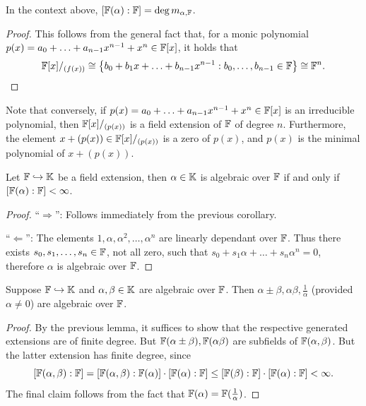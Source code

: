 \begin{corollary}
    In the context above, $[\mathbb{F}(\alpha) : \mathbb{F}] = \deg m_{\alpha,\mathbb{F}}$.
\end{corollary}

\begin{proof}
    This follows from the general fact that, for a monic polynomial $p(x) = a_0 + \ldots + a_{n-1} x^{n-1} + x^n \in \mathbb{F}[x]$, it holds that
    \[
        \mathbb{F}[x]/_{(f(x))} \cong \left\{ b_0 + b_1 x + \ldots + b_{n-1} x^{n-1} : b_0, \ldots, b_{n-1} \in \mathbb{F} \right\} \cong \mathbb{F}^n. \qedhere
    \]
\end{proof}

Note that conversely, if $p(x) = a_0 + \ldots + a_{n-1} x^{n-1} + x^n \in \mathbb{F}[x]$ is an irreducible polynomial, then $\mathbb{F}[x]/_{(p(x))}$ is a field extension of $\mathbb{F}$ of degree $n$. Furthermore, the element $x + (p(x)) \in \mathbb{F}[x]/_{(p(x))}$ is a zero of $p(x)$, and $p(x)$ is the minimal polynomial of $x + (p(x))$.

\begin{lemma}
    Let $\mathbb{F} \hookrightarrow \mathbb{K}$ be a field extension, then $\alpha \in \mathbb{K}$ is algebraic over $\mathbb{F}$ if and only if $[\mathbb{F}(\alpha) : \mathbb{F}] < \infty$.
\end{lemma}

\begin{proof}
    ``$\Longrightarrow$'': Follows immediately from the previous corollary.

    ``$\Longleftarrow$'': The elements $1, \alpha, \alpha^2, \ldots, \alpha^n$ are linearly dependant over $\mathbb{F}$. Thus there exists $s_0, s_1, \ldots, s_n \in \mathbb{F}$, not all zero, such that $s_0 + s_1 \alpha + \ldots + s_n \alpha^n = 0$, therefore $\alpha$ is algebraic over $\mathbb{F}$.
\end{proof}

\begin{corollary}
    Suppose $\mathbb{F} \hookrightarrow \mathbb{K}$ and $\alpha, \beta \in \mathbb{K}$ are algebraic over $\mathbb{F}$. Then $\alpha \pm \beta, \alpha \beta, \frac{1}{\alpha}$ (provided $\alpha \neq 0$) are algebraic over $\mathbb{F}$.
\end{corollary}

\begin{proof}
    By the previous lemma, it suffices to show that the respective generated extensions are of finite degree. But $\mathbb{F}(\alpha \pm \beta), \mathbb{F}(\alpha \beta)$ are subfields of $\mathbb{F}(\alpha, \beta)$. But the latter extension has finite degree, since
    \[
        [\mathbb{F}(\alpha, \beta) : \mathbb{F}] = [\mathbb{F}(\alpha, \beta) : \mathbb{F}(\alpha)] \cdot [\mathbb{F}(\alpha) : \mathbb{F}] \leq [\mathbb{F}(\beta) : \mathbb{F}] \cdot [\mathbb{F}(\alpha) : \mathbb{F}] < \infty.
    \]
    The final claim follows from the fact that $\mathbb{F}(\alpha) = \mathbb{F}(\frac{1}{\alpha})$.
\end{proof}

